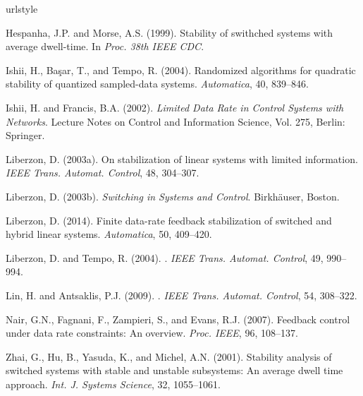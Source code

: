 \documentclass[a4, 11pt]{article}
\begin{document}

\begin{thebibliography}{10}
\providecommand{\natexlab}[1]{#1}
\providecommand{\url}[1]{\texttt{#1}}
\providecommand{\urlprefix}{URL }
\expandafter\ifx\csname urlstyle\endcsname\relax
  \providecommand{\doi}[1]{doi:\discretionary{}{}{}#1}\else
  \providecommand{\doi}{doi:\discretionary{}{}{}\begingroup
  \urlstyle{rm}\Url}\fi

Hespanha, J.P. and Morse, A.S. (1999).
\newblock Stability of swithched systems with average dwell-time.
\newblock In \emph{Proc. 38th IEEE CDC}.

Ishii, H., Ba\c{s}ar, T., and Tempo, R. (2004).
\newblock Randomized algorithms for quadratic stability of quantized
  sampled-data systems.
\newblock \emph{Automatica}, 40, 839--846.

Ishii, H. and Francis, B.A. (2002).
\newblock \emph{Limited Data Rate in Control Systems with Networks}.
\newblock Lecture Notes on Control and Information Science, Vol. 275, Berlin:
  Springer.

\bibitem[{Liberzon(2003{\natexlab{a}})}]{Liberzon2003}
Liberzon, D. (2003{\natexlab{a}}).
\newblock On stabilization of linear systems with limited information.
\newblock \emph{IEEE Trans. Automat. Control}, 48, 304--307.

\bibitem[{Liberzon(2003{\natexlab{b}})}]{Liberzon2003Book}
Liberzon, D. (2003{\natexlab{b}}).
\newblock \emph{Switching in Systems and Control}.
\newblock Birkh\"auser, Boston.

Liberzon, D. (2014).
\newblock Finite data-rate feedback stabilization of switched and hybrid linear
  systems.
\newblock \emph{Automatica}, 50, 409--420.

Liberzon, D. and Tempo, R. (2004).
.
\newblock \emph{IEEE Trans. Automat. Control}, 49, 990--994.

Lin, H. and Antsaklis, P.J. (2009).
.
\newblock \emph{IEEE Trans. Automat. Control}, 54, 308--322.

Nair, G.N., Fagnani, F., Zampieri, S., and Evans, R.J. (2007).
\newblock Feedback control under data rate constraints: An overview.
\newblock \emph{Proc. IEEE}, 96, 108--137.

Zhai, G., Hu, B., Yasuda, K., and Michel, A.N. (2001).
\newblock Stability analysis of switched systems with stable and unstable
  subsystems: An average dwell time approach.
\newblock \emph{Int. J. Systems Science}, 32, 1055--1061.

\end{thebibliography}
\end{document}
